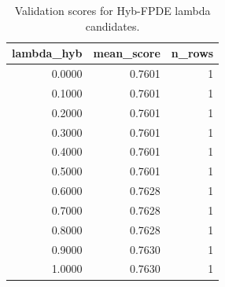\begin{table}[t]
\caption{Validation scores for Hyb-FPDE lambda candidates.}
\label{tab:lambda_distribution_computed}
\centering
\begin{tabular}{rrr}
\toprule
lambda\_hyb & mean\_score & n\_rows \\
\midrule
0.0000 & 0.7601 & 1 \\
0.1000 & 0.7601 & 1 \\
0.2000 & 0.7601 & 1 \\
0.3000 & 0.7601 & 1 \\
0.4000 & 0.7601 & 1 \\
0.5000 & 0.7601 & 1 \\
0.6000 & 0.7628 & 1 \\
0.7000 & 0.7628 & 1 \\
0.8000 & 0.7628 & 1 \\
0.9000 & 0.7630 & 1 \\
1.0000 & 0.7630 & 1 \\
\bottomrule
\end{tabular}

\end{table}
